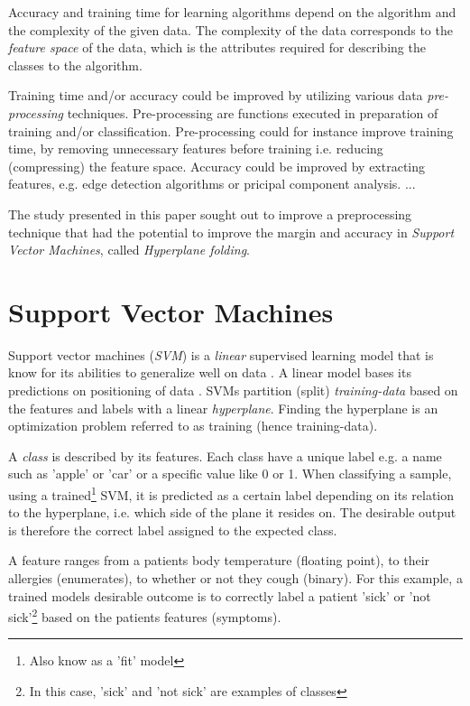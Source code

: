 \documentclass[a4paper,twoside]{bth}
\begin{document}
\par Accuracy and training time for learning algorithms depend on the algorithm and the complexity of the given data. The complexity of the data corresponds to the \textit{feature space} of the data, which is the attributes required for describing the classes to the algorithm\cite{Flach:2012:MLA:2490546}.

\par Training time and/or accuracy could be improved by utilizing various data \textit{pre-processing} techniques. Pre-processing are functions executed in preparation of training and/or classification. Pre-processing could for instance improve training time, by removing unnecessary features before training i.e. reducing (compressing) the feature space. Accuracy could be improved by extracting features, e.g. edge detection algorithms or pricipal component analysis. ...

\par The study presented in this paper sought out to improve a preprocessing technique that had the potential to improve the margin and accuracy in \textit{Support Vector Machines}, called \textit{Hyperplane folding}.

\section{Support Vector Machines}
Support vector machines (\textit{SVM}) is a \textit{linear} supervised learning model that is know for its abilities to generalize well on data \cite{multiconlitron}. A linear model bases its predictions on positioning of data \cite{Flach:2012:MLA:2490546, Cortes:1995:SN:218919.218929}. SVMs partition (split) \textit{training-data} based on the features and labels with a linear \textit{hyperplane}. Finding the hyperplane is an optimization problem referred to as training (hence training-data). 


\par A \textit{class} is described by its features. Each class have a unique label e.g. a name such as 'apple' or 'car' or a specific value like 0 or 1. When classifying a sample, using a trained\footnote{Also know as a 'fit' model} SVM, it is predicted as a certain label depending on its relation to the hyperplane, i.e. which side of the plane it resides on. The desirable output is therefore the correct label assigned to the expected class.

\par A feature ranges from a patients body temperature (floating point), to their allergies (enumerates), to whether or not they cough (binary). For this example, a trained models desirable outcome is to correctly label a patient 'sick' or 'not sick'\footnote{In this case, 'sick' and 'not sick' are examples of classes} based on the patients features (symptoms).
\end{document}
